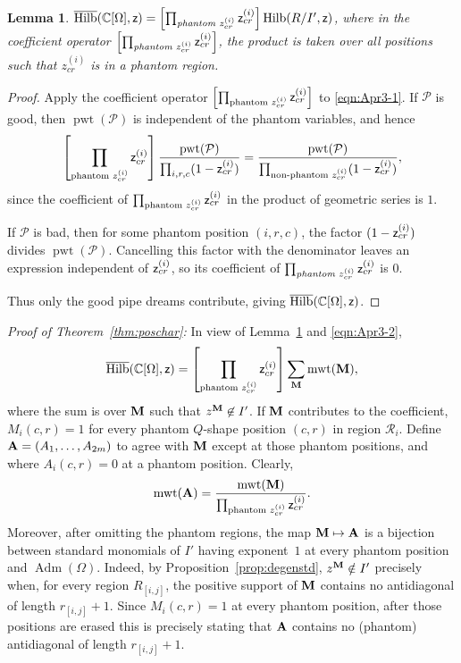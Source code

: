 \documentclass[12pt]{amsart}
\newtheorem{lemma}[theorem]{Lemma}
\theoremstyle{definition}
\theoremstyle{remark}
\begin{document}
\begin{lemma}\label{lemma:Apr3aaa1}
$\overline{\operatorname{Hilb}}({\mathbb C}[\Omega],{\sf z})=\left[\prod_{{\text{\emph{phantom} $z^{(i)}_{cr}$}}} {\sf z}_{cr}^{(i)}\right] 
\operatorname{Hilb}(R/I',{\sf z})$,
where in the coefficient operator $\left[\prod_{{\text{\emph{phantom} $z^{(i)}_{cr}$}}} {\sf z}_{cr}^{(i)}\right]$, the product
is taken over all positions such that $z_{cr}^{(i)}$ is in a phantom region. 
\end{lemma}
\begin{proof}
Apply the coefficient operator
$\left[\prod_{{\text{phantom $z_{cr}^{(i)}$}}}
{\sf z}_{cr}^{(i)}\right]$
to \eqref{eqn:Apr3-1}. If $\mathcal P$ is good, then
$\operatorname{pwt}(\mathcal P)$ is independent of the phantom variables, and hence
\[
\left[\prod_{\text{phantom $z_{cr}^{(i)}$}}
{\sf z}_{cr}^{(i)}\right]
\frac{\operatorname{pwt}(\mathcal P)}
{\prod_{i,r,c}(1-{\sf z}_{cr}^{(i)})}
=
\frac{\operatorname{pwt}(\mathcal P)}
{\prod_{\text{non-phantom }z_{cr}^{(i)}}(1-{\sf z}_{cr}^{(i)})},
\]
since the coefficient of
$\prod_{\text{phantom $z_{cr}^{(i)}$}}{\sf z}_{cr}^{(i)}$
in the product of geometric series is $1$.

If $\mathcal P$ is bad, then for some phantom position $(i,r,c)$,
the factor $(1-{\sf z}_{cr}^{(i)})$ divides
$\operatorname{pwt}(\mathcal P)$. Cancelling this factor with the
denominator leaves an expression independent of ${\sf z}_{cr}^{(i)}$,
so its coefficient of
$\prod_{\text{\emph{phantom} $z_{cr}^{(i)}$}}{\sf z}_{cr}^{(i)}$
is $0$.

Thus only the good pipe dreams contribute, giving
$\overline{\operatorname{Hilb}}(\mathbb C[\Omega],{\sf z})$.
\end{proof}

\noindent\emph{Proof of Theorem~\ref{thm:poschar}:} In view of Lemma~\ref{lemma:Apr3aaa1}
and \eqref{eqn:Apr3-2},
\[
\overline{\operatorname{Hilb}}({\mathbb C}[\Omega],{\sf z})=\left[\prod_{{\text{phantom $z^{(i)}_{cr}$}}} {\sf z}_{cr}^{(i)}\right]
\sum_{{\bf M}} \operatorname{mwt}({\bf M}),
\]
where the sum is over ${\bf M}$ such that $z^{\bf M}\not\in I'$. If ${\bf M}$ contributes to the coefficient,
 $M_i(c,r)=1$
for every phantom $Q$-shape position $(c,r)$ in region ${\mathcal R}_i$. Define ${\bf A}=(A_{1},\ldots,A_{2m})$ to agree with ${\bf M}$ except at those phantom positions,
and where $A_{i}(c,r)=0$ at a phantom position. Clearly,
\[\operatorname{mwt}({\bf A})=\frac{\operatorname{mwt}({\bf M})}{\prod_{{\text{phantom $z_{cr}^{(i)}$}}} {\sf z}_{cr}^{(i)}}.\]
Moreover, after omitting the phantom regions, the map ${\bf M}\mapsto {\bf A}$ is a bijection between standard monomials of $I'$ having
exponent~$1$ at every phantom position and $\operatorname{Adm}(\Omega)$.
Indeed, by Proposition~\ref{prop:degenstd},
$z^{\bf M}\notin I'$ precisely when, for every region \(R_{[i,j]}\),
the positive support of ${\bf M}$ contains no antidiagonal of length
$r_{[i,j]}+1$. Since $M_i(c,r)=1$ at every phantom position,
after those positions are erased this is precisely stating that
${\bf A}$ contains no (phantom) antidiagonal of length $r_{[i,j]}+1$.
\end{document}
